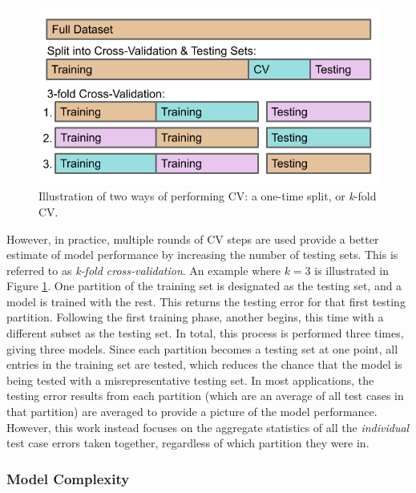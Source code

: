 \begin{figure}[!htb]
  \centering
  \includegraphics[width=0.85\linewidth]{./chapters/litrev/cverror.png}
  \caption[Illustration of cross validation]
          {Illustration of two ways of performing \gls{CV}: a one-time split, 
           or \textit{k}-fold \gls{CV}.}
  \label{fig:cverror}
\end{figure}

However, in practice, multiple rounds of \gls{CV} steps are used provide a
better estimate of model performance by increasing the number of testing sets.
This is referred to as \textit{k-fold cross-validation}.  An example where
$k=3$ is illustrated in Figure \ref{fig:cverror}.  One partition of the
training set is designated as the testing set, and a model is trained with the
rest. This returns the testing error for that first testing partition.
Following the first training phase, another begins, this time with a different
subset as the testing set.  In total, this process is performed three times,
giving three models. Since each partition becomes a testing set at one point,
all entries in the training set are tested, which reduces the chance that the
model is being tested with a misrepresentative testing set. In most
applications, the testing error results from each partition (which are an
average of all test cases in that partition) are averaged to provide a picture
of the model performance. However, this work instead focuses on the aggregate
statistics of all the \textit{individual} test case errors taken together,
regardless of which partition they were in.

\subsubsection{Model Complexity}
\label{sec:complexity}

